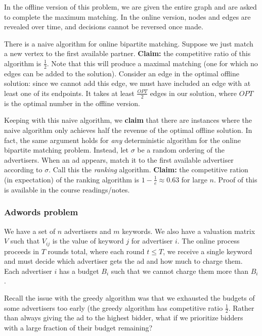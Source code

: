 \documentclass[titlepage, 12pt, leqno]{article}
\begin{document}
In the offline version of this problem, we are given the entire graph and are 
asked to complete the maximum matching. In the online version, nodes and edges
are revealed over time, and decisions cannot be reversed once made.

There is a naive algorithm for online bipartite matching. Suppose we just match a
new vertex to the first available partner. \textbf{Claim:} the competitive ratio
of this algorithm is $\frac{1}{2}$. Note that this will produce a maximal matching
(one for which no edges can be added to the solution). Consider an edge in the 
optimal offline solution: since we cannot add this edge, we must have included an
edge with at least one of its endpoints. It takes at least $\frac{OPT}{2}$ 
edges in our solution, where $OPT$ is the optimal number in the offline version.

Keeping with this naive algorithm, we \textbf{claim} that there are instances 
where the naive algorithm only achieves half the revenue of the optimal offline
solution. In fact, the same argument holds for \textit{any} deterministic
algorithm for the online bipartite matching problem. Instead, let $\sigma$ be a
random ordering of the advertisers. When an ad appears, match it to the first
available advertiser according to $\sigma$. Call this the \textit{ranking}
algorithm. \textbf{Claim:} the competitive ration (in expectation) of the
ranking algorithm is $1 - \frac{1}{e}\approx 0.63$ for large $n$. Proof of this is
available in the course readings/notes.

\subsubsection{Adwords problem}
We have a set of $n$ advertisers and $m$ keywords. We also have a valuation 
matrix $V$ such that $V_{ij}$ is the value of keyword $j$ for advertiser $i$. The
online process proceeds in $T$ rounds total, where each round $t \le T$, we
receive a single keyword and must decide which advertiser gets the ad and how much
to charge them. Each advertiser $i$ has a budget $B_{i}$ such that we cannot 
charge them more than $B_{i}$.

Recall the issue with the greedy algorithm was that we exhausted the budgets of
some advertisers too early (the greedy algorithm has competitive ratio
$\frac{1}{2}$. Rather than always giving the ad to the highest bidder, what if we
prioritize bidders with a large fraction of their budget remaining?
\end{document}
